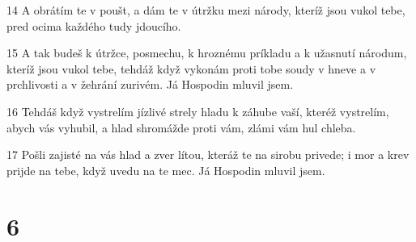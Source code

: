 \par 14 A obrátím te v poušt, a dám te v útržku mezi národy, kteríž jsou vukol tebe, pred ocima každého tudy jdoucího.
\par 15 A tak budeš k útržce, posmechu, k hroznému príkladu a k užasnutí národum, kteríž jsou vukol tebe, tehdáž když vykonám proti tobe soudy v hneve a v prchlivosti a v žehrání zurivém. Já Hospodin mluvil jsem.
\par 16 Tehdáš když vystrelím jízlivé strely hladu k záhube vaší, kteréž vystrelím, abych vás vyhubil, a hlad shromážde proti vám, zlámi vám hul chleba.
\par 17 Pošli zajisté na vás hlad a zver lítou, kteráž te na sirobu privede; i mor a krev prijde na tebe, když uvedu na te mec. Já Hospodin mluvil jsem.

\chapter{6}


